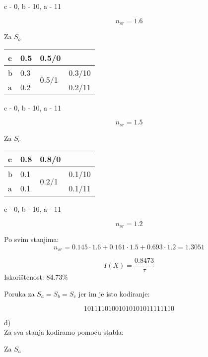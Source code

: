 \documentclass[12pt]{article}
\begin{document}
c - 0, b - 10, a - 11

$$n_{sr} = 1.6$$


Za $S_b$

\begin{table}[hp]
\centering
\begin{tabular}{|l|l|l|l}
\cline{1-3}
c & 0.5 & 0.5/0 &  \\ \hline
b & 0.3 & \multirow{2}{*}{0.5/1} & \multicolumn{1}{l|}{0.3/10} \\ \cline{1-2} \cline{4-4} 
a & 0.2 &  & \multicolumn{1}{l|}{0.2/11} \\ \hline
\end{tabular}
\end{table}

c - 0, b - 10, a - 11

$$n_{sr} = 1.5$$


Za $S_c$

\begin{table}[hp]
\centering
\begin{tabular}{|l|l|l|l}
\cline{1-3}
c & 0.8 & 0.8/0 &  \\ \hline
b & 0.1 & \multirow{2}{*}{0.2/1} & \multicolumn{1}{l|}{0.1/10} \\ \cline{1-2} \cline{4-4} 
a & 0.1 &  & \multicolumn{1}{l|}{0.1/11} \\ \hline
\end{tabular}
\end{table}

c - 0, b - 10, a - 11

$$n_{sr} = 1.2$$

Po svim stanjima: $$n_{sr} = 0.145 \cdot 1.6 + 0.161 \cdot 1.5 + 0.693 \cdot 1.2 = 1.3051$$

$$\overline{I(X)} = \frac{0.8473}{\tau}$$
Iskorištenost: 84.73\%

Poruka za $S_a = S_b = S_c$  jer im je isto kodiranje:

$$10111101001010101011111110$$

\newpage
d)\\

Za sva stanja kodiramo pomoću stabla:

Za $S_a$
\end{document}
